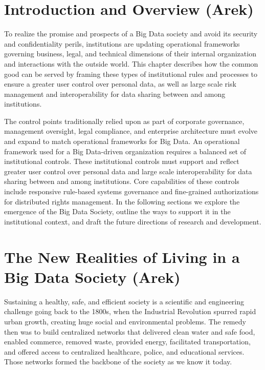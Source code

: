 \section{Introduction and Overview (Arek)}

To realize the promise and prospects of a Big Data society and avoid its security and confidentiality perils, institutions are updating operational frameworks governing business, legal, and technical dimensions of their internal organization and interactions with the outside world.
This chapter describes how the common good can be served by framing these types of institutional rules and processes to ensure a greater user control over personal data, as well as large scale risk management and interoperability for data sharing between and among institutions.

The control points traditionally relied upon as part of corporate governance, management oversight, legal compliance, and enterprise architecture must evolve and expand to match operational frameworks for Big Data.
An operational framework used for a Big Data-driven organization requires a balanced set of institutional controls.
These institutional controls must support and reflect greater user control over personal data and large scale interoperability for data sharing between and among institutions.
Core capabilities of these controls include responsive rule-based systems governance and fine-grained authorizations for distributed rights management.
In the following sections we explore the emergence of the Big Data Society, outline the ways to support it in the institutional context, and draft the future directions of research and development.

\section{The New Realities of Living in a Big Data Society (Arek)}

Sustaining a healthy, safe, and efficient society is a scientific and engineering challenge going back to the 1800s, when the Industrial Revolution spurred rapid urban growth, creating huge social and environmental problems.
The remedy then was to build centralized networks that delivered clean water and safe food, enabled commerce, removed waste, provided energy, facilitated transportation, and offered access to centralized healthcare, police, and educational services.
Those networks formed the backbone of the society as we know it today.

